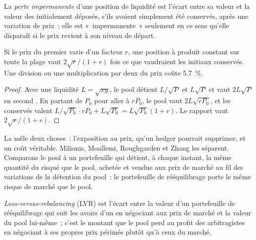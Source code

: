 \begin{definition}\label{def:m3:automated-market-makers:il}
La \emph{perte impermanente} d'une position de liquidité est l'écart entre sa valeur et la valeur
des  initialement déposés, s'ils avaient simplement été conservés, après une variation de prix~; elle est «~impermanente~» seulement en ce sens qu'elle disparaît si
le prix revient à son niveau de départ.
\end{definition}

\begin{proposition}\label{prop:m3:automated-market-makers:il}
Si le prix du premier  varie d'un facteur $r$, une position à produit constant sur toute la plage vaut $2\sqrt{r}/(1 + r)$ fois ce
que vaudraient les  initiaux conservés. Une division ou une multiplication par deux du prix coûte 5.7~\%.
\end{proposition}

\begin{proof}
Avec une liquidité $L = \sqrt{xy}$, le pool détient $L/\sqrt{P}$ et $L\sqrt{P}$ et vaut $2L\sqrt{P}$ en second . En partant de
$P_0$ pour aller à $rP_0$, le pool vaut $2L\sqrt{rP_0}$, et les  conservés valent $L/\sqrt{P_0} \cdot rP_0 + L\sqrt{P_0} = L\sqrt{P_0}(1 +
r)$. Le rapport vaut $2\sqrt{r}/(1 + r)$.
\end{proof}

La  mêle deux choses~: l'exposition au prix, qu'un hedger pourrait supprimer, et un coût véritable. Milionis, Moallemi,
Roughgarden et Zhang les séparent. Comparons le pool à un portefeuille qui détient, à chaque instant, la même quantité du  risqué que le
pool, achetée et vendue aux prix de marché au fil des variations de la détention du pool~: le portefeuille de rééquilibrage porte le même risque de marché que le
pool.

\begin{definition}\label{def:m3:automated-market-makers:lvr}
\emph{Loss-versus-rebalancing} (LVR) est l'écart entre la valeur d'un portefeuille de rééquilibrage qui
suit les avoirs d'un  en négociant aux prix de marché et la valeur du pool lui-même~; c'est le montant que le pool
perd au profit des arbitragistes en négociant à ses propres prix périmés plutôt qu'à ceux du marché.
\end{definition}

